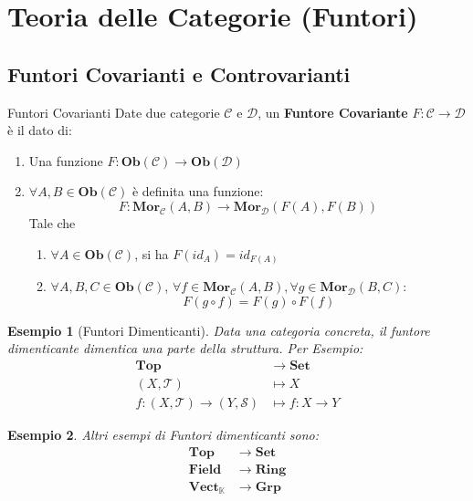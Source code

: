 \documentclass[11pt,a4paper,twoside]{article}
\newtheorem{es}{Esempio}
\theoremstyle{definition}
\begin{document}
\newpage

\section{Teoria delle Categorie (Funtori)}

\subsection{Funtori Covarianti e Controvarianti}

\begin{defn}{Funtori Covarianti}{}
	Date due categorie $\mathcal C$ e $\mathcal D$, un \textbf{Funtore Covariante} $F: \mathcal C \to \mathcal D$ è il dato di:
	\begin{enumerate}
		\item Una funzione $F: \bm{Ob}(\mathcal C) \to \bm{Ob}(\mathcal D)$
		\item $\forall A, B \in \bm{Ob}(\mathcal C)$ è definita una funzione:
			\[ F: \bm{Mor}_\mathcal C(A, B) \to \bm{Mor}_\mathcal D(F(A), F(B)) \]
			Tale che
			\begin{enumerate}
				\item $\forall A \in \bm{Ob}(\mathcal C)$, si ha $F(id_A) = id_{F(A)}$
				\item $\forall A, B, C \in \bm{Ob}(\mathcal C)$, $\forall f \in \bm{Mor}_\mathcal C(A, B), \forall g \in \bm{Mor}_\mathcal D(B, C)$:
					\[ F(g \circ f) = F(g) \circ F(f) \]
			\end{enumerate}
	\end{enumerate}
\end{defn}

\begin{es}[Funtori Dimenticanti]
	Data una categoria concreta, il funtore dimenticante dimentica una parte della struttura. Per Esempio:
	\begin{align*}
		\bm{Top} & \to \bm{Set}\\
		(X, \mathcal T) & \mapsto X\\
		f:(X, \mathcal T) \to (Y, \mathcal S) &\mapsto f:X \to Y
	\end{align*}
\end{es}

\begin{es}
	Altri esempi di Funtori dimenticanti sono:
	\begin{align*}
		\bm{Top} & \to \bm{Set}\\
		\bm{Field} & \to \bm{Ring}\\
		\bm{Vect}_{\mathbb K} &\to \bm{Grp}
	\end{align*}
\end{es}
\end{document}
